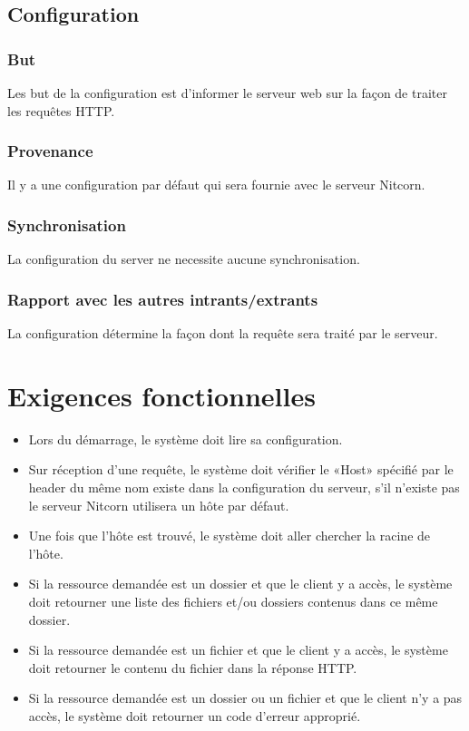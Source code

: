 \documentclass{scrreprt}
\begin{document}
\subsection{Configuration}
\subsubsection{But} Les but de la configuration est d'informer le serveur web sur la façon de traiter les requêtes HTTP.
\subsubsection{Provenance} Il y a une configuration par défaut qui sera fournie avec le serveur Nitcorn. 
\subsubsection{Synchronisation} La configuration du server ne necessite aucune synchronisation.
\subsubsection{Rapport avec les autres intrants/extrants} La configuration détermine la façon dont la requête sera traité par le serveur.
\section{Exigences fonctionnelles}
\begin{itemize}
    \item Lors du démarrage, le système doit lire sa configuration.
    \item Sur réception d'une requête, le système doit vérifier le «Host» spécifié par le header du même nom existe dans la configuration du serveur, s'il n'existe pas
        le serveur Nitcorn utilisera un hôte par défaut.
    \item Une fois que l'hôte est trouvé, le système doit aller chercher la racine de l'hôte.
    \item Si la ressource demandée est un dossier et que le client y a accès, le système doit retourner une liste des fichiers et/ou dossiers contenus dans ce même dossier.
    \item Si la ressource demandée est un fichier et que le client y a accès, le système doit retourner le contenu du fichier dans la réponse HTTP.
    \item Si la ressource demandée est un dossier ou un fichier et que le client n'y a pas accès, le système doit retourner un code d'erreur approprié.
\end{itemize}
\end{document}
